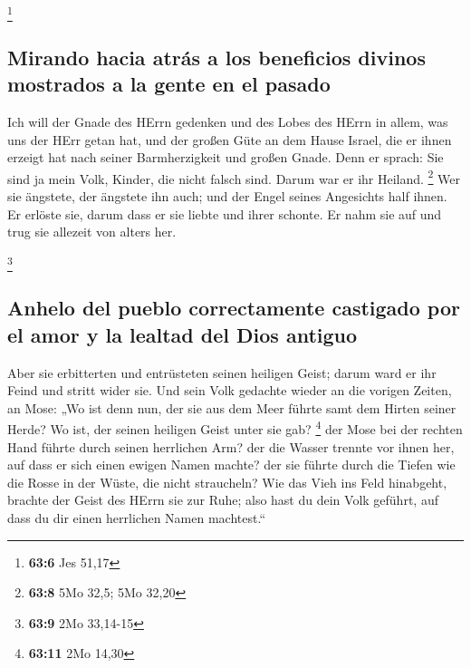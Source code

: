 \footnote{\textbf{63:6} Jes 51,17}

\hypertarget{mirando-hacia-atruxe1s-a-los-beneficios-divinos-mostrados-a-la-gente-en-el-pasado}{%
\subsection{Mirando hacia atrás a los beneficios divinos mostrados a la
gente en el
pasado}\label{mirando-hacia-atruxe1s-a-los-beneficios-divinos-mostrados-a-la-gente-en-el-pasado}}

 Ich will der Gnade des HErrn gedenken und des Lobes des
HErrn in allem, was uns der HErr getan hat, und der großen Güte an dem
Hause Israel, die er ihnen erzeigt hat nach seiner Barmherzigkeit und
großen Gnade.  Denn er sprach: Sie sind ja mein Volk,
Kinder, die nicht falsch sind. Darum war er ihr Heiland. \footnote{\textbf{63:8}
  5Mo 32,5; 5Mo 32,20}  Wer sie ängstete, der ängstete ihn
auch; und der Engel seines Angesichts half ihnen. Er erlöste sie, darum
dass er sie liebte und ihrer schonte. Er nahm sie auf und trug sie
allezeit von alters her.

\footnote{\textbf{63:9} 2Mo 33,14-15}

\hypertarget{anhelo-del-pueblo-correctamente-castigado-por-el-amor-y-la-lealtad-del-dios-antiguo}{%
\subsection{Anhelo del pueblo correctamente castigado por el amor y la
lealtad del Dios
antiguo}\label{anhelo-del-pueblo-correctamente-castigado-por-el-amor-y-la-lealtad-del-dios-antiguo}}

 Aber sie erbitterten und entrüsteten seinen heiligen
Geist; darum ward er ihr Feind und stritt wider sie.  Und
sein Volk gedachte wieder an die vorigen Zeiten, an Mose: „Wo ist denn
nun, der sie aus dem Meer führte samt dem Hirten seiner Herde? Wo ist,
der seinen heiligen Geist unter sie gab? \footnote{\textbf{63:11} 2Mo
  14,30}  der Mose bei der rechten Hand führte durch
seinen herrlichen Arm? der die Wasser trennte vor ihnen her, auf dass er
sich einen ewigen Namen machte?  der sie führte durch die
Tiefen wie die Rosse in der Wüste, die nicht straucheln? 
Wie das Vieh ins Feld hinabgeht, brachte der Geist des HErrn sie zur
Ruhe; also hast du dein Volk geführt, auf dass du dir einen herrlichen
Namen machtest.``

